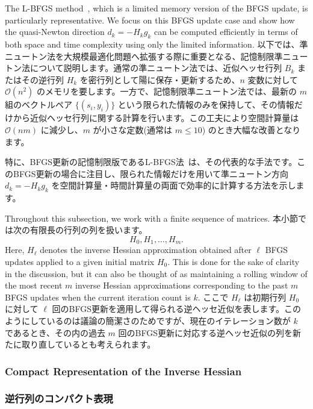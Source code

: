 \documentclass[0_main]{subfiles}
\begin{document}
    The L-BFGS method~\citep{liuLimitedMemoryBFGS1989}, which is a limited memory version of the BFGS update, is particularly representative. We focus on this BFGS update case and show how the quasi-Newton direction $d_k = -H_k g_k$ can be computed efficiently in terms of both space and time complexity using only the limited information.
\else
    以下では、準ニュートン法を大規模最適化問題へ拡張する際に重要となる、記憶制限準ニュートン法について説明します。通常の準ニュートン法では、近似ヘッセ行列 $B_k$ またはその逆行列 $H_k$ を密行列として陽に保存・更新するため、$n$ 変数に対して $\mathcal{O}(n^2)$ のメモリを要します。一方で、記憶制限準ニュートン法では、最新の $m$ 組のベクトルペア $\{(s_i,y_i)\}$ という限られた情報のみを保持して、その情報だけから近似ヘッセ行列に関する計算を行います。この工夫により空間計算量は $\mathcal{O}(nm)$ に減少し、$m$ が小さな定数(通常は $m\le 10$) のとき大幅な改善となります。

    特に、BFGS更新の記憶制限版であるL-BFGS法~\citep{liuLimitedMemoryBFGS1989}は、その代表的な手法です。このBFGS更新の場合に注目し、限られた情報だけを用いて準ニュートン方向 $d_k = -H_k g_k$ を空間計算量・時間計算量の両面で効率的に計算する方法を示します。
\fi

\ifEn
    Throughout this subsection, we work with a finite sequence of matrices.
\else
    本小節では次の有限長の行列の列を扱います。
\fi
\begin{equation*}
    H_0, H_1, \dots, H_m.
\end{equation*}
\ifEn
    Here, $H_\ell$ denotes the inverse Hessian approximation obtained after $\ell$ BFGS updates applied to a given initial matrix $H_0$. This is done for the sake of clarity in the discussion, but it can also be thought of as maintaining a rolling window of the most recent $m$ inverse Hessian approximations corresponding to the past $m$ BFGS updates when the current iteration count is $k$.
\else
    ここで $H_\ell$ は初期行列 $H_0$ に対して $\ell$ 回のBFGS更新を適用して得られる逆ヘッセ近似を表します。このようにしているのは議論の簡潔さのためですが、現在のイテレーション数が $k$ であるとき、その内の過去 $m$ 回のBFGS更新に対応する逆ヘッセ近似の列を新たに取り直しているとも考えられます。
\fi

\ifEn
    \subsubsection{Compact Representation of the Inverse Hessian}
\else
    \subsubsection{逆行列のコンパクト表現}
\fi
\end{document}

